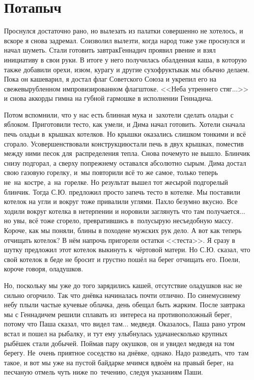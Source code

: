 \chapter{Потапыч} 
\vepsianrose

Проснулся достаточно рано, но вылезать из палатки совершенно не хотелось, и вскоре я снова задремал. Соизволил вылезти, когда народ тоже уже проснулся и начал шуметь. Стали готовить завтрак\mdash Геннадич проявил рвение и взял инициативу в свои руки. В итоге у него получилась обалденная каша, в которую также добавили орехи, изюм, курагу и другие сухофрукты\mdash как мы обычно делаем. Пока он кашеварил, я достал флаг Советского Союза и укрепил его на свежевырубленном импровизированном флагштоке. <<Неба утреннего стяг$\ldots$>> и снова аккорды гимна на губной гармошке в исполнении Геннадича. 

Потом вспомнили, что у нас есть блинная мука и~захотели сделать оладьи с яблоком. Приготовили тесто, как умели, и Дима начал готовить. Хотели сначала печь оладьи в~крышках котелков. Но крышки оказались слишком тонкими и всё сгорало. Усовершенствовали конструкцию\mdash стали печь в двух крышках, поместив между ними песок для~распределения тепла. Снова почему\sdash то не вышло. Блинчик снизу подгорал, а сверху по\sdash прежнему оставался абсолютно сырым. Дима достал свою газовую горелку, и~мы повторили всё то же самое, только теперь не~на~костре, а~на~горелке. Но результат вышел тот же\mdash сырой подгорелый блинчик. Тогда С.Ю. предложил просто запечь тесто в котелке. Мы поставили котелок на угли и вокруг тоже привалили углями. Пахло безумно вкусно. Все ходили вокруг котелка в нетерпении и норовили заглянуть что там получается$\ldots$ но увы, всё тоже сгорело, превратившись в~полусырую несъедобную массу. Короче, как мы поняли, блины в походе\mdash не мужских рук дело. А вот как теперь отчищать котелок? В нём напрочь пригорели остатки <<теста>>. Я сразу в шутку предложил этот котелок выкинуть к~чёртовой матери. Но С.Ю. сказал, что свой котелок в беде не бросит и грустно пошёл на берег отчищать его. Поели, короче говоря, оладушков.

Но, поскольку мы уже до того зарядились кашей, отсутствие оладушков нас не сильно огорчило. Так что днёвка начиналась почти отлично. По синему\sdash синему небу плыли частые кучевые облачка, день обещал быть жарким. После завтрака мы с Геннадичем решили сплавать из~интереса на противоположный берег, потому что Паша сказал, что видел там$\ldots$ медведя. Оказалось, Паша рано утром встал и пошел на рыбалку, и тут ему улыбнулась удача\mdash несколько крупных рыбёшек стали добычей. Поймав пару окушков, он и увидел медведя на том берегу. Не~очень приятное соседство на днёвке, однако. Надо разведать, что~там такое, и вот мы уже на пустой байдарке мчимся вдвоём на правый берег, на песчаную отмель чуть ниже по~течению, следуя указаниям Паши.

